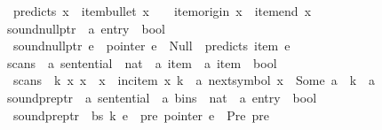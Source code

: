 \begin{isabellebody}
\ \ {\isachardoublequoteopen}predicts\ x\ {\isasymequiv}\ item{\isacharunderscore}{\kern0pt}bullet\ x\ {\isacharequal}{\kern0pt}\ {}\ {\isasymand}\ item{\isacharunderscore}{\kern0pt}origin\ x\ {\isacharequal}{\kern0pt}\ item{\isacharunderscore}{\kern0pt}end\ x{\isachardoublequoteclose}\isanewline
\isanewline
{}\isamarkupfalse%
\ sound{\isacharunderscore}{\kern0pt}null{\isacharunderscore}{\kern0pt}ptr\ {\isacharcolon}{\kern0pt}{\isacharcolon}{\kern0pt}\ {\isachardoublequoteopen}{\isacharprime}{\kern0pt}a\ entry\ {\isasymRightarrow}\ bool{\isachardoublequoteclose}\ \isanewline
\ \ {\isachardoublequoteopen}sound{\isacharunderscore}{\kern0pt}null{\isacharunderscore}{\kern0pt}ptr\ e\ {\isasymequiv}\ pointer\ e\ {\isacharequal}{\kern0pt}\ Null\ {\isasymlongrightarrow}\ predicts\ {\isacharparenleft}{\kern0pt}item\ e{\isacharparenright}{\kern0pt}{\isachardoublequoteclose}\isanewline
\isanewline
{}\isamarkupfalse%
\ scans\ {\isacharcolon}{\kern0pt}{\isacharcolon}{\kern0pt}\ {\isachardoublequoteopen}{\isacharprime}{\kern0pt}a\ sentential\ {\isasymRightarrow}\ nat\ {\isasymRightarrow}\ {\isacharprime}{\kern0pt}a\ item\ {\isasymRightarrow}\ {\isacharprime}{\kern0pt}a\ item\ {\isasymRightarrow}\ bool{\isachardoublequoteclose}\ \isanewline
\ \ {\isachardoublequoteopen}scans\ {\isasymomega}\ k\ x{\isacharprime}{\kern0pt}\ x\ {\isasymequiv}\ x\ {\isacharequal}{\kern0pt}\ inc{\isacharunderscore}{\kern0pt}item\ x{\isacharprime}{\kern0pt}\ k\ {\isasymand}\ {\isacharparenleft}{\kern0pt}{\isasymexists}a{\isachardot}{\kern0pt}\ next{\isacharunderscore}{\kern0pt}symbol\ x{\isacharprime}{\kern0pt}\ {\isacharequal}{\kern0pt}\ Some\ a\ {\isasymand}\ {\isasymomega}{\isacharbang}{\kern0pt}{\isacharparenleft}{\kern0pt}k{\isacharminus}{\kern0pt}{}{\isacharparenright}{\kern0pt}\ {\isacharequal}{\kern0pt}\ a{\isacharparenright}{\kern0pt}{\isachardoublequoteclose}\isanewline
\isanewline
{}\isamarkupfalse%
\ sound{\isacharunderscore}{\kern0pt}pre{\isacharunderscore}{\kern0pt}ptr\ {\isacharcolon}{\kern0pt}{\isacharcolon}{\kern0pt}\ {\isachardoublequoteopen}{\isacharprime}{\kern0pt}a\ sentential\ {\isasymRightarrow}\ {\isacharprime}{\kern0pt}a\ bins\ {\isasymRightarrow}\ nat\ {\isasymRightarrow}\ {\isacharprime}{\kern0pt}a\ entry\ {\isasymRightarrow}\ bool{\isachardoublequoteclose}\ \isanewline
\ \ {\isachardoublequoteopen}sound{\isacharunderscore}{\kern0pt}pre{\isacharunderscore}{\kern0pt}ptr\ {\isasymomega}\ bs\ k\ e\ {\isasymequiv}\ {\isasymforall}pre{\isachardot}{\kern0pt}\ pointer\ e\ {\isacharequal}{\kern0pt}\ Pre\ pre\ {\isasymlongrightarrow}\isanewline

\end{isabellebody}
